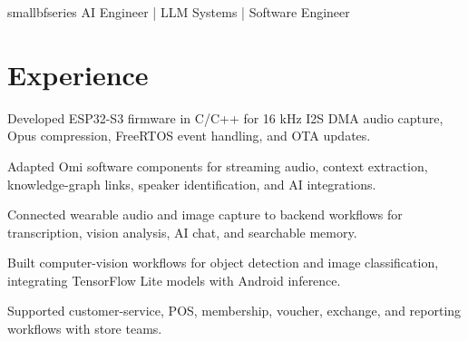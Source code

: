 \documentclass{../../templates/1/resume}
\begin{document}

{small}{bfseries} AI Engineer | LLM Systems | Software Engineer\par\vspace{2 pt}

\section{Experience}

\begin{resumeitemize}
\item Developed ESP32-S3 firmware in C/C++ for 16 kHz I2S DMA audio capture, Opus compression, FreeRTOS event handling, and OTA updates.
\item Adapted Omi software components for streaming audio, context extraction, knowledge-graph links, speaker identification, and AI integrations.
\item Connected wearable audio and image capture to backend workflows for transcription, vision analysis, AI chat, and searchable memory.
\end{resumeitemize}

\begin{resumeitemize}
\item Built computer-vision workflows for object detection and image classification, integrating TensorFlow Lite models with Android inference.
\end{resumeitemize}

\begin{resumeitemize}
\item Supported customer-service, POS, membership, voucher, exchange, and reporting workflows with store teams.
\end{resumeitemize}
\end{document}
